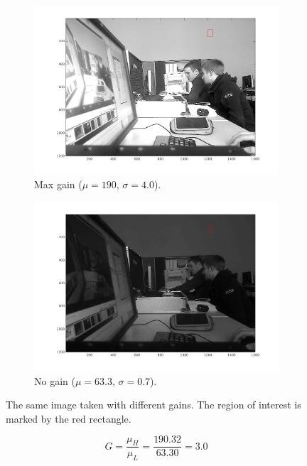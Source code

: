 \documentclass[a4paper, 12pt]{paper}
\begin{document}
\begin{figure}[H]
    \centering
    \begin{subfigure}[b]{0.47\textwidth}
        \includegraphics[width=\textwidth]{img/plot_d_range_max_gain_w_rect}
        \caption{Max gain ($\mu = 190$, $\sigma = 4.0$).}
    \end{subfigure}
    \begin{subfigure}[b]{0.47\textwidth}
        \includegraphics[width=\textwidth]{img/plot_d_range_no_gain_w_rect}
        \caption{No gain ($\mu = 63.3$, $\sigma = 0.7$).}
    \end{subfigure}
    \caption{The same image taken with different gains.
        The region of interest is marked by the red rectangle.}
\label{fig:hdr_roi}
\end{figure}

\begin{equation}
    G = \frac{\mu_H}{\mu_L} = \frac{190.32}{63.30} = 3.0
    \label{equ:dyn_range_factor}
\end{equation}
\end{document}
